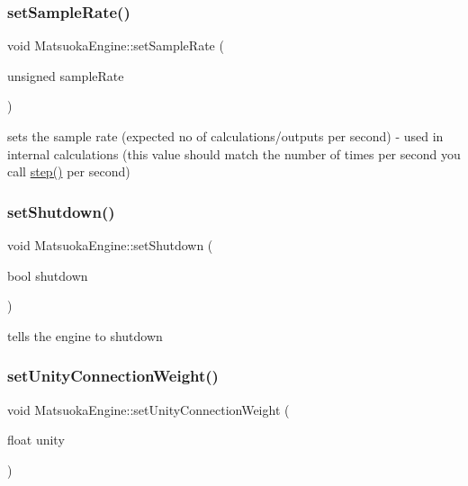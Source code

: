 \subsubsection{\texorpdfstring{set\+Sample\+Rate()}{setSampleRate()}}
{\footnotesize\ttfamily void Matsuoka\+Engine\+::set\+Sample\+Rate (\begin{DoxyParamCaption}\item[{unsigned}]{sample\+Rate }\end{DoxyParamCaption})}

sets the sample rate (expected no of calculations/outputs per second) -\/ used in internal calculations (this value should match the number of times per second you call \mbox{\hyperlink{classMatsuokaEngine_a4fa468dc0814f1ad92594f7a4d5abd00}{step()}} per second) \mbox{\label{classMatsuokaEngine_afca77a2464c5852a0dbb9eed2d191ecb}} 
\subsubsection{\texorpdfstring{set\+Shutdown()}{setShutdown()}}
{\footnotesize\ttfamily void Matsuoka\+Engine\+::set\+Shutdown (\begin{DoxyParamCaption}\item[{bool}]{shutdown }\end{DoxyParamCaption})}



tells the engine to shutdown 

\mbox{\label{classMatsuokaEngine_aa7254e0141ad5763ff6267a8430b30ab}} 
\subsubsection{\texorpdfstring{set\+Unity\+Connection\+Weight()}{setUnityConnectionWeight()}}
{\footnotesize\ttfamily void Matsuoka\+Engine\+::set\+Unity\+Connection\+Weight (\begin{DoxyParamCaption}\item[{float}]{unity }\end{DoxyParamCaption})}



